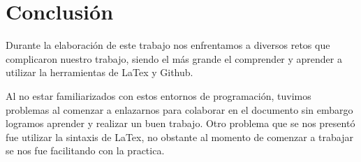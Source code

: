 \section{Conclusión} \label{sec:conclusion}

Durante la elaboración de este trabajo nos enfrentamos a diversos retos que complicaron nuestro trabajo, siendo el más grande el comprender y aprender a utilizar la herramientas de LaTex y Github. 

Al no estar familiarizados con estos entornos de programación, tuvimos problemas al comenzar a enlazarnos para colaborar en el documento sin embargo logramos aprender y realizar un buen trabajo. Otro problema que se nos presentó fue utilizar la sintaxis de LaTex, no obstante al momento de comenzar a trabajar se nos fue facilitando con la practica. 

